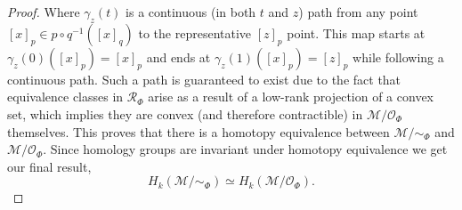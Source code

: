 \documentclass[10pt,a4paper]{amsart}
\begin{document}
\begin{proof}
    Where $\gamma_z(t)$ is a continuous (in both $t$ and $z$) path from any point $[x]_p \in p\circ q^{-1}([x]_q)$ to the representative $[z]_p$ point. This map starts at $\gamma_z(0)([x]_p) = [x]_p$ and ends at $\gamma_z(1)([x]_p) = [z]_p$ while following a continuous path. Such a path is guaranteed to exist due to the fact that equivalence classes in $\mathcal{R}_\Phi$ arise as a result of a low-rank projection of a convex set, which implies they are convex (and therefore contractible) in $\mathcal{M}/\mathcal{O}_\Phi$ themselves. This proves that there is a homotopy equivalence between $\mathcal{M}/\sim_\Phi$ and $\mathcal{M}/\mathcal{O}_\Phi$. Since homology groups are invariant under homotopy equivalence we get our final result,
    \begin{equation*}
        H_k(\mathcal{M}/\sim_\Phi) \simeq H_k(\mathcal{M}/\mathcal{O}_\Phi).
    \end{equation*}
\end{proof}
\end{document}
